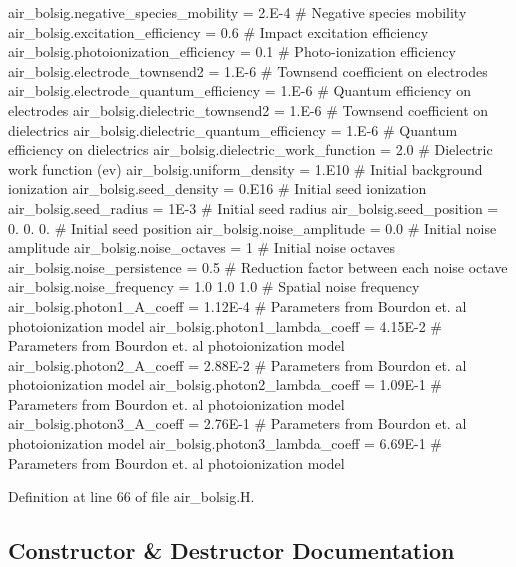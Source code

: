 \begin{DoxyVerb}
air_bolsig.negative_species_mobility     = 2.E-4                 # Negative species mobility
air_bolsig.excitation_efficiency         = 0.6                   # Impact excitation efficiency
air_bolsig.photoionization_efficiency    = 0.1                   # Photo-ionization efficiency
air_bolsig.electrode_townsend2           = 1.E-6                 # Townsend coefficient on electrodes
air_bolsig.electrode_quantum_efficiency  = 1.E-6                 # Quantum efficiency on electrodes
air_bolsig.dielectric_townsend2          = 1.E-6                 # Townsend coefficient on dielectrics
air_bolsig.dielectric_quantum_efficiency = 1.E-6                 # Quantum efficiency on dielectrics
air_bolsig.dielectric_work_function      = 2.0                   # Dielectric work function (ev)
air_bolsig.uniform_density               = 1.E10                 # Initial background ionization
air_bolsig.seed_density                  = 0.E16                 # Initial seed ionization
air_bolsig.seed_radius                   = 1E-3                  # Initial seed radius
air_bolsig.seed_position                 = 0. 0. 0.              # Initial seed position
air_bolsig.noise_amplitude               = 0.0                   # Initial noise amplitude
air_bolsig.noise_octaves                 = 1                     # Initial noise octaves
air_bolsig.noise_persistence             = 0.5                   # Reduction factor between each noise octave
air_bolsig.noise_frequency               = 1.0 1.0 1.0           # Spatial noise frequency
air_bolsig.photon1_A_coeff               = 1.12E-4               # Parameters from Bourdon et. al photoionization model
air_bolsig.photon1_lambda_coeff          = 4.15E-2               # Parameters from Bourdon et. al photoionization model
air_bolsig.photon2_A_coeff               = 2.88E-2               # Parameters from Bourdon et. al photoionization model
air_bolsig.photon2_lambda_coeff          = 1.09E-1               # Parameters from Bourdon et. al photoionization model
air_bolsig.photon3_A_coeff               = 2.76E-1               # Parameters from Bourdon et. al photoionization model
air_bolsig.photon3_lambda_coeff          = 6.69E-1               # Parameters from Bourdon et. al photoionization model\end{DoxyVerb}
 

Definition at line 66 of file air\+\_\+bolsig.\+H.



\subsection{Constructor \& Destructor Documentation}
